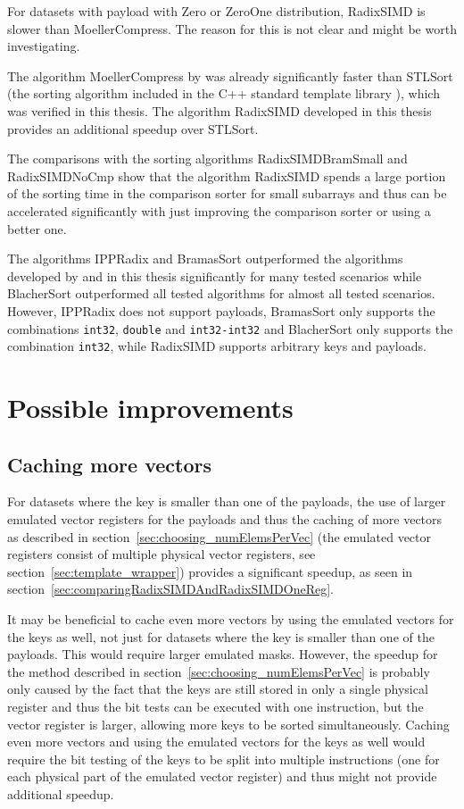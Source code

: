\documentclass[12pt, a4paper, openright, twoside]{tiarbeit}
\begin{document}
For datasets with payload with Zero or ZeroOne distribution, RadixSIMD
is slower than MoellerCompress. The reason for this is not clear and might
be worth investigating.

The algorithm MoellerCompress by \citet{moeller_radix} was already
significantly faster than STLSort (the sorting algorithm included in the C++ standard
template library \citep{enwiki:stl_sort}), which was verified in this thesis.
The algorithm RadixSIMD developed in this thesis provides an additional
speedup over STLSort.

The comparisons with the sorting algorithms RadixSIMDBramSmall and RadixSIMDNoCmp
show that the algorithm RadixSIMD spends a large portion of the sorting
time in the comparison sorter for small subarrays and thus can be
accelerated significantly with just improving the comparison sorter or
using a better one.

The algorithms IPPRadix and BramasSort \citep{bramas} outperformed the algorithms
developed by \citet{moeller_radix} and in this thesis significantly
for many tested scenarios while BlacherSort \citep{blacher} outperformed all tested
algorithms for almost all tested scenarios.
However, IPPRadix does not support payloads, BramasSort only supports the combinations
\texttt{int32}, \texttt{double} and \texttt{int32-int32} and BlacherSort
only supports the combination \texttt{int32}, while
RadixSIMD supports arbitrary keys and payloads.


\section{Possible improvements}

\subsection{Caching more vectors}

For datasets where the key is smaller than one of the payloads, the use of
larger emulated vector registers for the payloads and thus the caching of
more vectors as described in section~\ref{sec:choosing_numElemsPerVec}
(the emulated vector registers consist of multiple
physical vector registers, see section~\ref{sec:template_wrapper})
provides a significant speedup, as seen in
section~\ref{sec:comparingRadixSIMDAndRadixSIMDOneReg}.

It may be beneficial to cache even more vectors by using the emulated
vectors for the keys as well, not just for datasets where the key is
smaller than one of the payloads. This would require larger emulated
masks.
However, the speedup for the method described in section~\ref{sec:choosing_numElemsPerVec}
is probably only caused by the fact that the keys are still stored in only
a single physical register and thus the bit tests can be executed with one
instruction, but the vector register is larger, allowing more keys
to be sorted simultaneously. Caching even more vectors and using the
emulated vectors for the keys as well would require the bit testing of the
keys to be split into multiple instructions
(one for each physical part of the emulated vector register)
and thus might not provide additional speedup.
\end{document}
